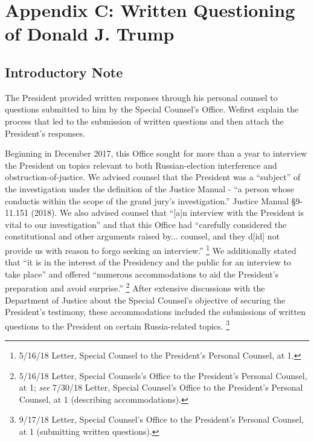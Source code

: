 \section{Appendix C: Written Questioning of Donald J. Trump}

\subsection{Introductory Note}

The President provided written responses through his personal counsel to questions submitted to him by the Special Counsel’s Office. Wefirst explain the process that led to the submission of written questions and then attach the President’s responses.

Beginning in December 2017, this Office sought for more than a year to interview the President on topics relevant to both Russian-election interference and obstruction-of-justice.
We advised counsel that the President was a “subject” of the investigation under the definition of the Justice Manual - “a person whose conductis within the scope of the grand jury’s investigation.”
Justice Manual \S 9-11.151 (2018).
We also advised counsel that “[a]n interview with the President is vital to our investigation” and that this Office had “carefully considered the constitutional and other arguments raised by... counsel, and they d[id] not provide us with reason to forgo seeking an interview.”%
\footnote{5/16/18 Letter, Special Counsel to the President’s Personal Counsel, at 1.}
We additionally stated that “it is in the interest of the Presidency and the public for an interview to take place” and offered “numerous accommodations to aid the President’s preparation and avoid surprise.”%
\footnote{5/16/18 Letter, Special Counsels’s Office to the President’s Personal Counsel, at 1;
\textit{see} 7/30/18 Letter, Special Counsel’s Office to the President’s Personal Counsel, at 1 (describing accommodations).}
After extensive discussions with the Department of Justice about the Special Counsel’s objective of securing the President’s testimony, these accommodations included the submissions of written questions to the President on certain Russia-related topics.%
\footnote{9/17/18 Letter, Special Counsel’s Office to the President’s Personal Counsel, at 1 (submitting written questions).}

